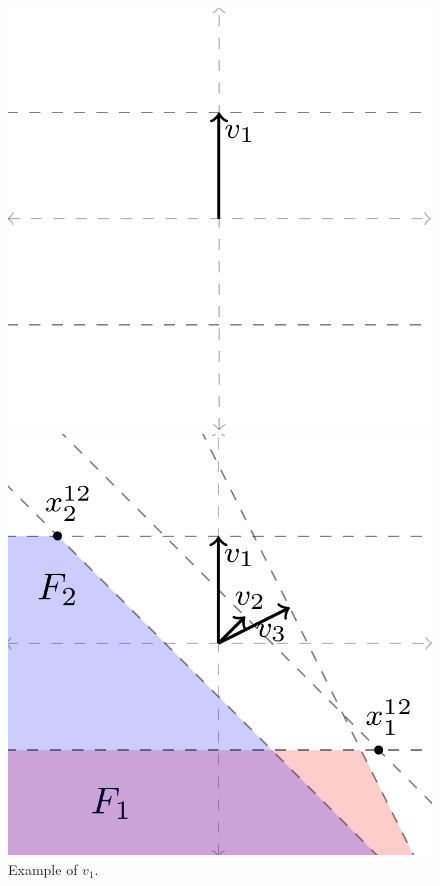 \documentclass[anon]{colt2020} %
\begin{document}
\begin{figure}
	\begin{minipage}{0.3\linewidth}
		\centering
		\includegraphics[width=0.9\linewidth]{tikz/v1}
		\caption{Example of $v_1$.}
		\label{fig:v1}
	\end{minipage}
	\hfill
	\begin{minipage}{0.3\linewidth}
		\centering
		\includegraphics[width=0.9\linewidth]{tikz/qp-must-intersect-line-same-spot}

\end{minipage}
\end{figure}
\end{document}
